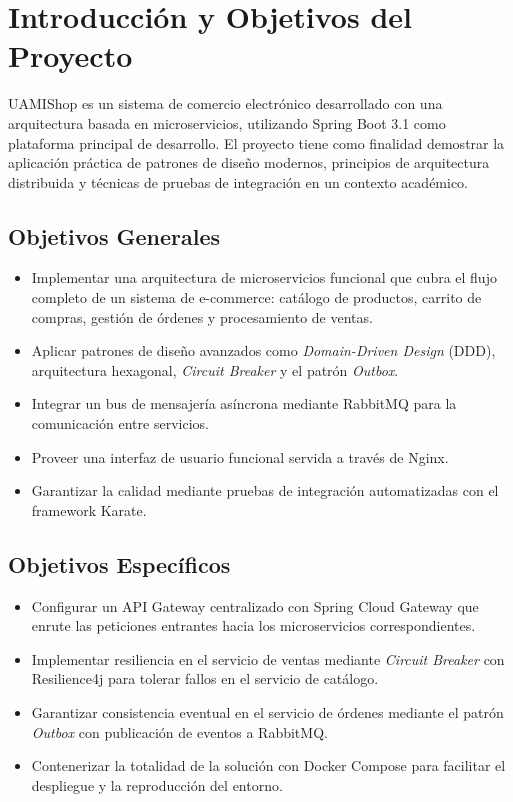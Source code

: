\documentclass[12pt,a4paper]{article}
\begin{document}
\section{Introducci\'on y Objetivos del Proyecto}

UAMIShop es un sistema de comercio electr\'onico desarrollado con una arquitectura basada
en microservicios, utilizando Spring Boot 3.1 como plataforma principal de desarrollo.
El proyecto tiene como finalidad demostrar la aplicaci\'on pr\'actica de patrones de dise\~no
modernos, principios de arquitectura distribuida y t\'ecnicas de pruebas de integraci\'on en
un contexto acad\'emico.

\subsection{Objetivos Generales}

\begin{itemize}
  \item Implementar una arquitectura de microservicios funcional que cubra el flujo completo
        de un sistema de e-commerce: cat\'alogo de productos, carrito de compras, gesti\'on
        de \'ordenes y procesamiento de ventas.
  \item Aplicar patrones de dise\~no avanzados como \textit{Domain-Driven Design} (DDD),
        arquitectura hexagonal, \textit{Circuit Breaker} y el patr\'on \textit{Outbox}.
  \item Integrar un bus de mensajer\'ia as\'incrona mediante RabbitMQ para la comunicaci\'on
        entre servicios.
  \item Proveer una interfaz de usuario funcional servida a trav\'es de Nginx.
  \item Garantizar la calidad mediante pruebas de integraci\'on automatizadas con el
        framework Karate.
\end{itemize}

\subsection{Objetivos Espec\'ificos}

\begin{itemize}
  \item Configurar un API Gateway centralizado con Spring Cloud Gateway que enrute las
        peticiones entrantes hacia los microservicios correspondientes.
  \item Implementar resiliencia en el servicio de ventas mediante \textit{Circuit Breaker}
        con Resilience4j para tolerar fallos en el servicio de cat\'alogo.
  \item Garantizar consistencia eventual en el servicio de \'ordenes mediante el patr\'on
        \textit{Outbox} con publicaci\'on de eventos a RabbitMQ.
  \item Contenerizar la totalidad de la soluci\'on con Docker Compose para facilitar el
        despliegue y la reproducci\'on del entorno.
\end{itemize}
\end{document}
